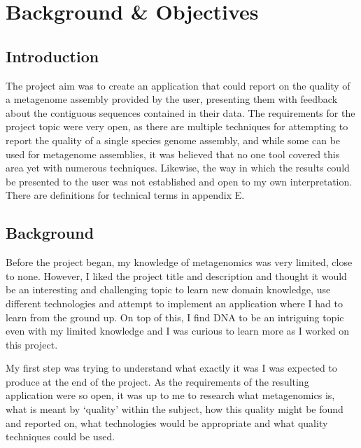 \chapter{Background \& Objectives}


\section{Introduction}
The project aim was to create an application that could report on the quality of a metagenome assembly provided by the user, presenting them with feedback about the contiguous sequences contained in their data. The requirements for the project topic were very open, as there are multiple techniques for attempting to report the quality of a single species genome assembly, and while some can be used for metagenome assemblies, it was believed that no one tool covered this area yet with numerous techniques. Likewise, the way in which the results could be presented to the user was not established and open to my own interpretation. There are definitions for technical terms in appendix E.


\section{Background}
Before the project began, my knowledge of metagenomics was very limited, close to none. However, I liked the project title and description and thought it would be an interesting and challenging topic to learn new domain knowledge, use different technologies and attempt to implement an application where I had to learn from the ground up. On top of this, I find DNA to be an intriguing topic even with my limited knowledge and I was curious to learn more as I worked on this project.

My first step was trying to understand what exactly it was I was expected to produce at the end of the project. As the requirements of the resulting application were so open, it was up to me to research what metagenomics is, what is meant by `quality' within the subject, how this quality might be found and reported on, what technologies would be appropriate and what quality techniques could be used.

